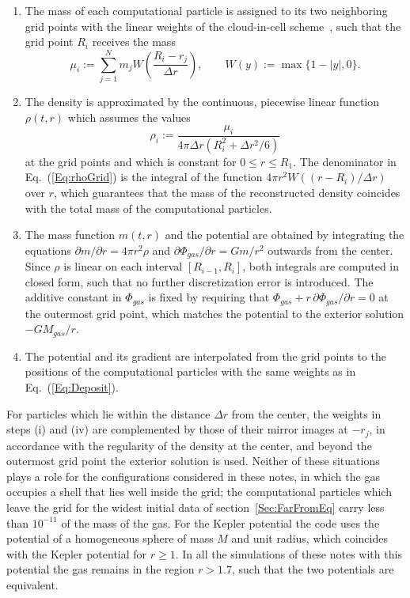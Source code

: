 \begin{enumerate}
\item[(i)] The mass of each computational particle is assigned to its two neighboring grid points with the linear weights of the cloud-in-cell scheme~\cite{BirdsallLangdon-Book,HockneyEastwood-Book}, such that the grid point $R_i$ receives the mass
\begin{equation}
\mu_i := \sum\limits_{j=1}^N m_j W\left( \frac{R_i - r_j}{\Delta r} \right),\qquad
W(y) := \max\{ 1 - |y|,0 \}.
\label{Eq:Deposit}
\end{equation}
\item[(ii)] The density is approximated by the continuous, piecewise linear function $\rho(t,r)$ which assumes the values
\begin{equation}
\rho_i := \frac{\mu_i}{4\pi\Delta r\left( R_i^2 + \Delta r^2/6 \right)}
\label{Eq:rhoGrid}
\end{equation}
at the grid points and which is constant for $0\leq r\leq R_1$. The denominator in Eq.~(\ref{Eq:rhoGrid}) is the integral of the function $4\pi r^2 W((r - R_i)/\Delta r)$ over $r$, which guarantees that the mass of the reconstructed density coincides with the total mass of the computational particles.
\item[(iii)] The mass function $m(t,r)$ and the potential are obtained by integrating the equations $\partial m/\partial r = 4\pi r^2\rho$ and $\partial\Phi_{gas}/\partial r = G m/r^2$ outwards from the center. Since $\rho$ is linear on each interval $[R_{i-1},R_i]$, both integrals are computed in closed form, such that no further discretization error is introduced. The additive constant in $\Phi_{gas}$ is fixed by requiring that $\Phi_{gas} + r\,\partial\Phi_{gas}/\partial r = 0$ at the outermost grid point, which matches the potential to the exterior solution $-G M_{gas}/r$.
\item[(iv)] The potential and its gradient are interpolated from the grid points to the positions of the computational particles with the same weights as in Eq.~(\ref{Eq:Deposit}).
\end{enumerate}
For particles which lie within the distance $\Delta r$ from the center, the weights in steps (i) and (iv) are complemented by those of their mirror images at $-r_j$, in accordance with the regularity of the density at the center, and beyond the outermost grid point the exterior solution is used. Neither of these situations plays a role for the configurations considered in these notes, in which the gas occupies a shell that lies well inside the grid; the computational particles which leave the grid for the widest initial data of section~\ref{Sec:FarFromEq} carry less than $10^{-11}$ of the mass of the gas. For the Kepler potential the code uses the potential of a homogeneous sphere of mass $M$ and unit radius, which coincides with the Kepler potential for $r\geq 1$. In all the simulations of these notes with this potential the gas remains in the region $r > 1.7$, such that the two potentials are equivalent.

